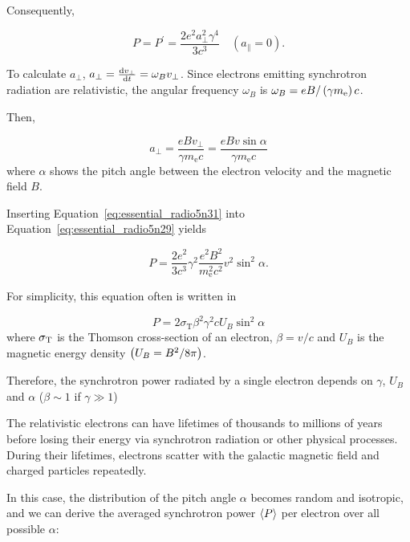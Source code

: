 Consequently,

\begin{equation}\label{eq:essential_radio5n29}
    P=P^{\prime}=\frac{2 e^{2} a_{\perp}^{2} \gamma^{4}}{3 c^{3}} \quad\left(a_{\|}=0\right).
\end{equation}

To calculate $a_{\perp}$, $a_{\perp} = \frac{\mathrm{d} v_{\perp}}{\mathrm{d} t} = \omega_B v_{\perp}$.
Since electrons emitting synchrotron radiation are relativistic, the angular frequency $\omega_{B}$ is $\omega_B = eB / \left(\gamma m_{\mathrm{e}}\right)c$.

Then,

\begin{equation}\label{eq:essential_radio5n31}
    a_{\perp}=\frac{e B v_{\perp}}{\gamma m_{\mathrm{e}} c}=\frac{e B v \sin \alpha}{\gamma m_{\mathrm{e}} c}
\end{equation}
where $\alpha$ shows the pitch angle between the electron velocity and the magnetic field $B$.

Inserting Equation~\ref{eq:essential_radio5n31} into Equation~\ref{eq:essential_radio5n29} yields

\begin{equation}\label{eq:essential_radio5n32}
    P=\frac{2 e^{2}}{3 c^{3}} \gamma^{2} \frac{e^{2} B^{2}}{m_{\mathrm{e}}^{2} c^{2}} v^{2} \sin ^{2} \alpha.
\end{equation}

For simplicity, this equation often is written in

\begin{equation}\label{eq:essential_radio5n37}
    P=2 \sigma_{\mathrm{T}} \beta^{2} \gamma^{2} c U_{B} \sin ^{2} \alpha
\end{equation}
where $\sigma_{\mathrm{T}}$ is the Thomson cross-section of an electron, $\beta=v / c$ and $U_B$ is the magnetic energy density $\left(U_B = B^2 / 8\pi\right)$.

Therefore, the synchrotron power radiated by a single electron depends on $\gamma$, $U_B$ and $\alpha$ ($\beta\sim1$ if $\gamma \gg 1$)

The relativistic electrons can have lifetimes of thousands to millions of years before losing their energy via synchrotron radiation or other physical processes.
During their lifetimes, electrons scatter with the galactic magnetic field and charged particles repeatedly.

In this case, the distribution of the pitch angle $\alpha$ becomes random and isotropic, and we can derive the averaged synchrotron power $\left\langle P\right\rangle$ per electron over all possible $\alpha$:

